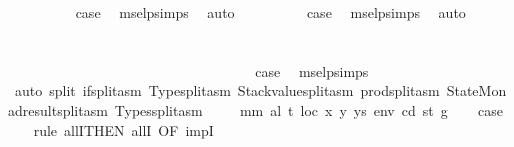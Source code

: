 \begin{isabellebody}
{\isacharbrackright}{\kern0pt}{\isacharparenright}{\kern0pt}\isanewline
\ \ \isamarkupfalse%
\ {}\isanewline
\ \ \isamarkupfalse%
\ \isamarkupfalse%
\ {\isacharquery}{\kern0pt}case\ \isamarkupfalse%
\ msel{\isachardot}{\kern0pt}psimps{\isacharparenleft}{\kern0pt}{}{\isacharparenright}{\kern0pt}\ \isamarkupfalse%
\ auto\isanewline
{}\isamarkupfalse%
\isanewline
\ \ \isamarkupfalse%
\ {}\isanewline
\ \ \isamarkupfalse%
\ \isamarkupfalse%
\ {\isacharquery}{\kern0pt}case\ \isamarkupfalse%
\ msel{\isachardot}{\kern0pt}psimps{\isacharparenleft}{\kern0pt}{}{\isacharparenright}{\kern0pt}\ \isamarkupfalse%
\ auto\isanewline
{}\isamarkupfalse%
\ \ \ \ \ \ \ \ \ \ \ \ \ \ \ \ \ \ \ \ \ \ \ \ \ \ \ \ \ \ \ \ \ \ \ \ \ \ \ \ \ \ \ \ \ \ \ \ \ \ \ \ \ \ \ \ \ \ \ \ \ \ \ \ \ \ \ \ \ \ \ \ \ \ \ \ \ \ \ \ \ \ \ \ \ \ \ \ \ \ \ \ \ \ \ \ \ \ \ \ \ \ \ \ \ \ \ \ \ \ \ \ \ \ \ \ \ \ \ \ \ \ \ \ \ \ \ \ \ \ \ \ \ \ \ \ \ \ \ \ \ \ \ \ \ \ \ \ \ \ \ \ \ \ \ \ \ \ \ \ \ \ \ \ \ \ \ \ \ \isanewline
\ \ \isamarkupfalse%
\ {}\isanewline
\ \ \isamarkupfalse%
\ \isamarkupfalse%
\ {\isacharquery}{\kern0pt}case\ \isamarkupfalse%
\ msel{\isachardot}{\kern0pt}psimps{\isacharparenleft}{\kern0pt}{}{\isacharparenright}{\kern0pt}\ \isamarkupfalse%
\ {\isacharparenleft}{\kern0pt}auto\ split{\isacharcolon}{\kern0pt}\ if{\isacharunderscore}{\kern0pt}split{\isacharunderscore}{\kern0pt}asm\ Type{\isachardot}{\kern0pt}split{\isacharunderscore}{\kern0pt}asm\ Stackvalue{\isachardot}{\kern0pt}split{\isacharunderscore}{\kern0pt}asm\ prod{\isachardot}{\kern0pt}split{\isacharunderscore}{\kern0pt}asm\ StateMonad{\isachardot}{\kern0pt}result{\isachardot}{\kern0pt}split{\isacharunderscore}{\kern0pt}asm\ Types{\isachardot}{\kern0pt}split{\isacharunderscore}{\kern0pt}asm{\isacharparenright}{\kern0pt}\isanewline
{}\isamarkupfalse%
\isanewline
\ \ \isamarkupfalse%
\ {\isacharparenleft}{\kern0pt}{}\ mm\ al\ t\ loc\ x\ y\ ys\ env\ cd\ st\ g{\isacharparenright}{\kern0pt}\isanewline
\ \ \isamarkupfalse%
\ {\isacharquery}{\kern0pt}case\isanewline
\ \ \isamarkupfalse%
\ {\isacharparenleft}{\kern0pt}rule\ allI{\isacharbrackleft}{\kern0pt}THEN\ allI{\isacharcomma}{\kern0pt}\ OF\ impI{\isacharbrackright}{\kern0pt}{\isacharparenright}{\kern0pt}\isanewline

\end{isabellebody}

